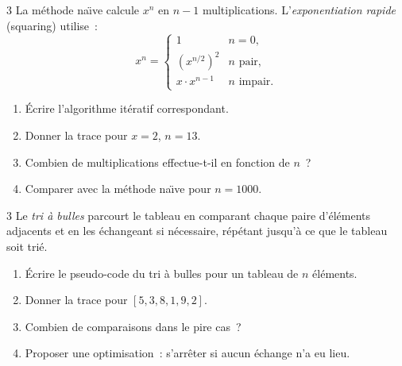 \begin{exo}{3}
La m\'ethode na\"\i ve calcule $x^n$ en $n-1$ multiplications.
L'\emph{exponentiation rapide} (squaring) utilise~:
\[ x^n = \begin{cases} 1 & n=0, \\ (x^{n/2})^2 & n \text{ pair,} \\ x \cdot x^{n-1} & n \text{ impair.}\end{cases} \]
\begin{enumerate}
  \item \'Ecrire l'algorithme it\'eratif correspondant.
  \item Donner la trace pour $x=2$, $n=13$.
  \item Combien de multiplications effectue-t-il en fonction de $n$~?
  \item Comparer avec la m\'ethode na\"\i ve pour $n=1000$.
\end{enumerate}
\end{exo}

\begin{exo}{3}
Le \emph{tri \`a bulles} parcourt le tableau en comparant chaque paire
d'\'el\'ements adjacents et en les \'echangeant si n\'ecessaire, r\'ep\'etant
jusqu'\`a ce que le tableau soit tri\'e.
\begin{enumerate}
  \item \'Ecrire le pseudo-code du tri \`a bulles pour un tableau de $n$ \'el\'ements.
  \item Donner la trace pour $[5, 3, 8, 1, 9, 2]$.
  \item Combien de comparaisons dans le pire cas~?
  \item Proposer une optimisation~: s'arr\^eter si aucun \'echange n'a eu lieu.
\end{enumerate}
\end{exo}


